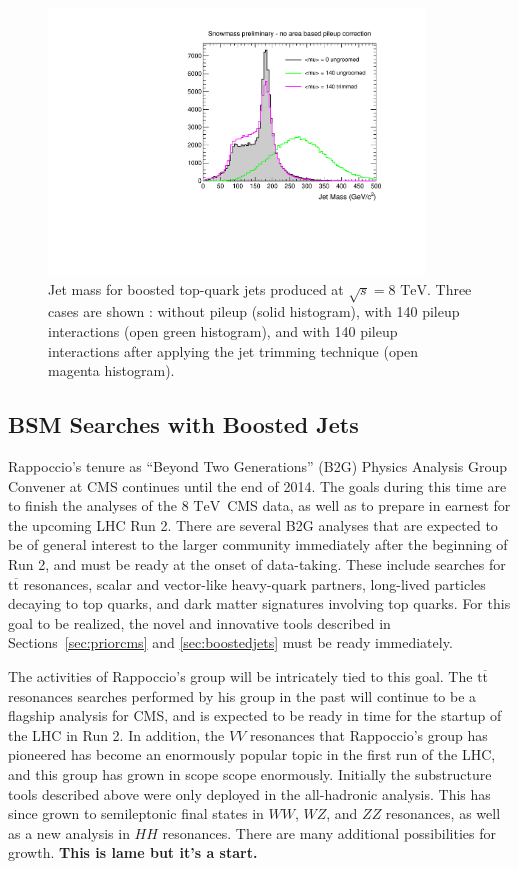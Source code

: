 \documentclass[12pt]{proposalnsf}
\newcommand{\TeV}{\ensuremath{\mathrm{TeV}}}
\newcommand{\ttbar}        {\ensuremath{\mathrm{t}\overline{\mathrm{t}}}}
\begin{document}
\begin{figure}[h!]
    \centering
    \includegraphics[width=100mm]{jetmass_toptags_trimming}
    \caption{\label{jetmass_toptags_trimming} Jet mass for boosted
      top-quark jets produced at $\sqrt{s} = 8$ \TeV. Three cases are
      shown : without pileup (solid histogram), with 140 pileup
      interactions (open green histogram), and with 140 pileup
      interactions after applying the jet trimming technique (open
      magenta histogram).}
\end{figure}


\subsection{BSM Searches with Boosted Jets}
\label{sec:bsm}

Rappoccio's tenure as ``Beyond Two Generations'' (B2G) Physics
Analysis Group Convener at CMS continues until the end of 2014. The
goals during this time are to
finish the analyses of the 8 \TeV\ CMS data, as well as to prepare in
earnest for the upcoming LHC Run 2. There are several B2G analyses
that are expected to be of general interest to the larger community
immediately after the beginning of Run 2, and must be ready at the
onset of data-taking. These include searches for
$\ttbar$ resonances, scalar and vector-like heavy-quark partners,
long-lived particles decaying to top quarks, and dark matter
signatures involving top quarks. For this goal to be realized,
the novel and innovative tools described in
Sections~\ref{sec:priorcms} and \ref{sec:boostedjets} must
be ready immediately. 

The activities of Rappoccio's group will be intricately tied to this
goal. The $\ttbar$ resonances searches performed by his group in the
past will continue to be a flagship analysis for CMS, and is expected
to be ready in time for the startup of the LHC in Run 2. In addition,
the $VV$ resonances that Rappoccio's group has pioneered has become an
enormously popular topic in the first run of the LHC, and this group
has grown in scope scope enormously. Initially the substructure tools
described above were only deployed in the all-hadronic analysis. This
has since grown to semileptonic final states in $WW$, $WZ$, and $ZZ$
resonances, as well as a new analysis in $HH$ resonances. There are
many additional possibilities for growth. 
{\bf This is lame but it's a start.}
\end{document}
